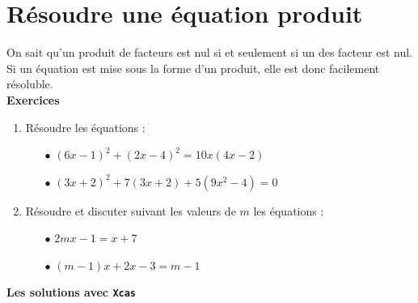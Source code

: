 \documentclass[a4paper,11pt]{book}
\begin{document}
\section{R\'esoudre une \'equation produit}
On sait qu'un produit de facteurs est nul si et seulement si un des facteur 
est nul.
Si un \'equation est mise sous la forme d'un produit, elle est donc facilement r\'esoluble.\\
{\bf Exercices}
\begin{enumerate}
\item R\'esoudre les \'equations :
\begin{itemize}
\item[$\bullet$] $(6x-1)^2+(2x-4)^2=10x(4x-2)$
\item[$\bullet$] $(3x+2)^2+7(3x+2)+5(9x^2-4)=0$
\end{itemize}
\item R\'esoudre et discuter suivant les valeurs de $m$ les \'equations :
\begin{itemize}
\item[$\bullet$] $2mx-1=x+7$
\item[$\bullet$] $(m-1)x+2x-3=m-1$
\end{itemize}
\end{enumerate}
{\bf Les solutions avec {\tt Xcas}}
\end{document}
